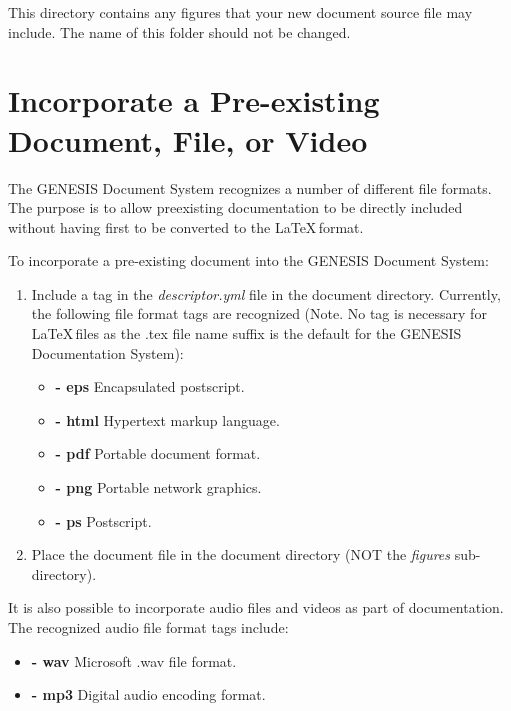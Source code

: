 \documentclass[12pt]{article}
\begin{document}
This directory contains any figures that your new document source file may include. The name of this folder should not be changed.

\section*{Incorporate a Pre-existing Document, File, or Video}

The GENESIS Document System recognizes a number of different file formats. The purpose is to allow preexisting documentation to be directly included without having first to be converted to the \LaTeX\,format.

To incorporate a pre-existing document into the GENESIS Document System:

\begin{enumerate}

\item Include a tag in the {\it descriptor.yml} file in the document directory. Currently, the following file format tags are recognized (Note. No tag is necessary for  \LaTeX\,files as the .tex file name suffix is the default for the GENESIS Documentation System):

\begin{itemize}

\item[]{\bf - eps} Encapsulated postscript.
\item[]{\bf - html} Hypertext markup language.
\item[]{\bf - pdf} Portable document format.
\item[]{\bf - png} Portable network graphics.
\item[]{\bf - ps} Postscript.

\end{itemize}

\item Place the document file in the document directory (NOT the {\it figures} sub-directory).

\end{enumerate}

It is also possible to incorporate audio files and videos as part of documentation. The recognized audio file format tags include:

\begin{itemize}

\item[]{\bf - wav} Microsoft .wav file format.
\item[]{\bf - mp3} Digital audio encoding format.

\end{itemize}
\end{document}
